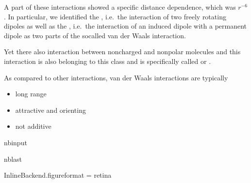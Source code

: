 \documentclass[letterpaper,10pt,english]{sphinxmanual}
\begin{document}
\sphinxAtStartPar
A part of these interactions showed a specific distance dependence, which was \(r^{-6}\). In particular, we identified the , i.e. the interaction of two freely rotating dipoles as well as the , i.e. the interaction of an induced dipole with a permanent dipole as two parts of the so\sphinxhyphen{}called van der Waals interaction.

\sphinxAtStartPar
Yet there also interaction between non\sphinxhyphen{}charged and non\sphinxhyphen{}polar molecules and this interaction is also belonging to this class and is specifically called  or .

\sphinxAtStartPar
As compared to other interactions, van der Waals interactions are typically
\begin{itemize}
\item {} 
\sphinxAtStartPar
long range

\item {} 
\sphinxAtStartPar
attractive and orienting

\item {} 
\sphinxAtStartPar
not additive

\end{itemize}

\begin{sphinxuseclass}{nbinput}
\begin{sphinxuseclass}{nblast}
{
\begin{sphinxVerbatim}[commandchars=\\\{\}]
\llap{\color{nbsphinxin}[150]:\,\hspace{\fboxrule}\hspace{\fboxsep}}   
   
   
   
 

 InlineBackend.figure\PYGZus{}format = \PYGZsq{}retina\PYGZsq{}

    
      

\end{sphinxVerbatim}
}

\end{sphinxuseclass}
\end{sphinxuseclass}
\end{document}
